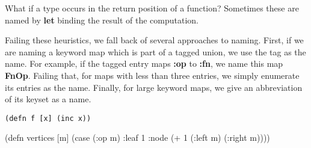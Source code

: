 What if a type occurs in the return position of a function?
Sometimes these are named by \textbf{let} binding the result
of the computation.

Failing these heuristics, we fall back of several approaches
to naming.
First, if we are naming a keyword map which is part of a tagged
union, we use the tag as the name. For example, if the tagged entry
maps \textbf{:op} to \textbf{:fn}, we name this map \textbf{FnOp}.
Failing that, for maps with less than three entries, we simply
enumerate its entries as the name.
Finally, for large keyword maps, we give an abbreviation
of its keyset as a name.

\begin{Verbatim}
(defn f [x] (inc x))
\end{Verbatim}

\begin{figure*}
\begin{cljlisting}
(defn vertices [m]
  (case (:op m)
    :leaf 1
    :node (+ 1 (:left m) (:right m))))
\end{cljlisting}
\label{code:vertices}
\end{figure*}



